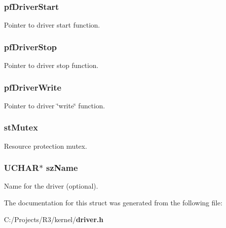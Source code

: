 \subsubsection[{pfDriverStart}]{ {\bf pfDriverStart}}\label{struct_d_r_i_v_e_r___s_t_r_u_c_t_a59b41c420a4617608925521ca51445c0}


Pointer to driver start function. 
\subsubsection[{pfDriverStop}]{ {\bf pfDriverStop}}\label{struct_d_r_i_v_e_r___s_t_r_u_c_t_a9bb41afe6a91de85a18df7030b44d5d8}


Pointer to driver stop function. 
\subsubsection[{pfDriverWrite}]{ {\bf pfDriverWrite}}\label{struct_d_r_i_v_e_r___s_t_r_u_c_t_a408e93d7bb22e3e70c38b5c5a174b1e0}


Pointer to driver \char`\"{}write\char`\"{} function. 
\subsubsection[{stMutex}]{ {\bf stMutex}}\label{struct_d_r_i_v_e_r___s_t_r_u_c_t_a1a9ce0954973db87466b94a97d49b24a}


Resource protection mutex. 
\subsubsection[{szName}]{\setlength{\rightskip}{0pt plus 5cm}UCHAR$\ast$ {\bf szName}}\label{struct_d_r_i_v_e_r___s_t_r_u_c_t_adf80ae78bcd7cd804c23c5e116fe07bb}


Name for the driver (optional). 

The documentation for this struct was generated from the following file:\begin{DoxyCompactItemize}
\item 
C:/Projects/R3/kernel/{\bf driver.h}\end{DoxyCompactItemize}

